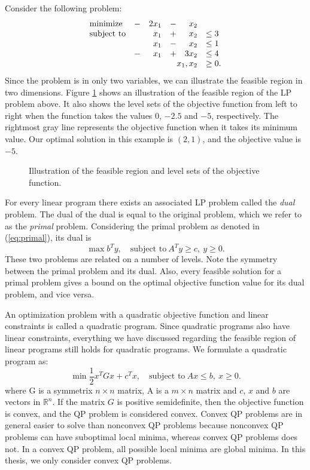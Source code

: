 Consider the following problem:
\[
\begin{array}{lcrcrl}
    \textrm{minimize}   &-& 2 x_1 &-&   x_2 \\
    \textrm{subject to} & &   x_1 &+&   x_2 & \leq 3 \\
                        & &   x_1 &-&   x_2 & \leq 1 \\
                        &-&   x_1 &+& 3 x_2 & \leq 4 \\
     \multicolumn{5}{r}{x_1,x_2}            & \geq 0.
\end{array}
\]
Since the problem is in only two variables, we can illustrate the feasible
region in two dimensions.
Figure \ref{fig:lpback} shows an illustration of the feasible
region of the LP problem above. It also shows the level sets of the objective
function from left to right when the function takes the values $0$, $-2.5$ and
$-5$, respectively.
The rightmost gray line represents the objective function when it takes
its minimum value. Our optimal solution in this example is $(2,1)$, and the
objective value is $-5$.

\begin{figure}[ht!]
\centering

\caption{Illustration of the feasible region and level sets of the objective
         function.}
\label{fig:lpback}
\end{figure}

For every linear program there exists an associated LP problem called
the \textit{dual} problem.
The dual of the dual is equal to the original problem, which we refer to as
the \textit{primal} problem.
Considering the primal problem as denoted in (\ref{eq:primal}), its dual is
\[
\max{b^T y},\quad \textrm{subject to}~A^T y \geq c, ~ y \geq 0.
\]
These two problems are related on a number of levels.
Note the symmetry between the primal problem and its dual.
Also, every feasible solution for a primal problem gives a bound on the optimal
objective function value for its dual problem, and vice
versa\cite{vanderbei,nocedal,boyd}.

An optimization problem with a quadratic objective function and linear
constraints is called a quadratic program. Since quadratic programs also have
linear constraints, everything we have discussed regarding the feasible region
of linear programs still holds for quadratic programs. We formulate a quadratic
program as:
\[
\min{\frac{1}{2}x^T G x + c^T x},\quad \textrm{subject to}~Ax \leq b, ~ x \geq 0.
\]
where G is a symmetrix $n \times n$ matrix, A is a $m \times n$ matrix
and $c$, $x$ and $b$ are vectors in $\mathbb{R}^n$. If the matrix $G$ is
positive semidefinite, then the objective function is convex, and the
QP problem is considered convex.
Convex QP problems are in general easier to solve than
nonconvex QP problems because nonconvex QP problems can have suboptimal
local minima, whereas convex QP problems does not.
In a convex QP problem, all possible local minima are global
minima. In this thesis, we only consider convex QP problems.

